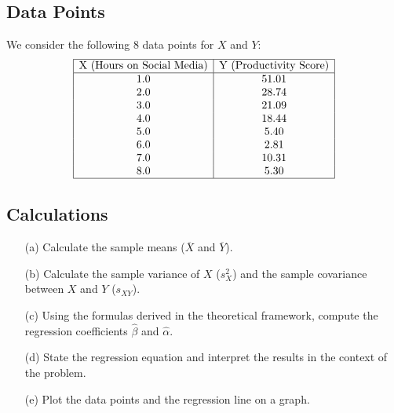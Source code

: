 \documentclass[11pt]{article}
\begin{document}
\subsection*{Data Points}
We consider the following 8 data points for \(X\) and \(Y\):
\[
\begin{array}{|c|c|}
\hline 
    \text{X (Hours on Social Media)} & \text{Y (Productivity Score)} \\ \hline 
    1.0 & 51.01 \\
    2.0 & 28.74 \\
    3.0 & 21.09 \\
    4.0 & 18.44 \\
    5.0 & 5.40 \\
    6.0 & 2.81 \\
    7.0 & 10.31 \\
    8.0 & 5.30 \\ \hline 
\end{array}
\]

\subsection*{Calculations}
\begin{itemize}
    \item[(a)] Calculate the sample means (\(\overline{X}\) and \(\overline{Y}\)).
    \item[(b)] Calculate the sample variance of \(X\) (\(s_X^2\)) and the sample covariance between \(X\) and \(Y\) (\(s_{XY}\)).
    \item[(c)] Using the formulas derived in the theoretical framework, compute the regression coefficients \(\hat{\beta}\) and \(\hat{\alpha}\).
    \item[(d)] State the regression equation and interpret the results in the context of the problem.
    \item[(e)] Plot the data points and the regression line on a graph.
\end{itemize}
\end{document}
